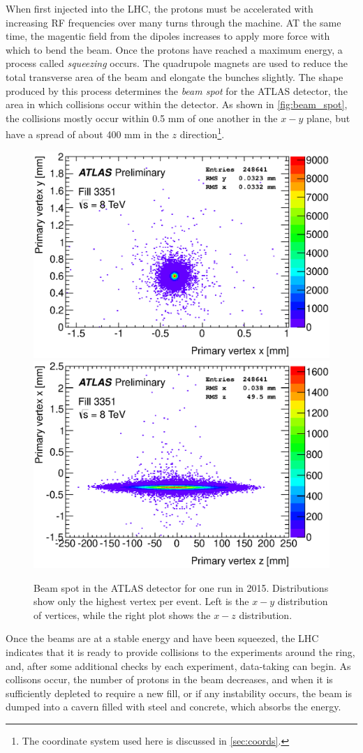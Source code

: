 When first injected into the \ac{LHC}, the protons must be accelerated with increasing \ac{RF} frequencies over many turns through the machine. AT the same time, the magentic field from the dipoles increases to apply more force with which to bend the beam. Once the protons have reached a maximum energy, a process called \textit{squeezing} occurs. The quadrupole magnets are used to reduce the total transverse area of the beam and elongate the bunches slightly. The shape produced by this process determines the \textit{beam spot} for the \ac{ATLAS} detector, the area in which collisions occur within the detector. As shown in \autoref{fig:beam_spot}, the collisions mostly occur within 0.5 mm of one another in the $x-y$ plane, but have a spread of about 400 mm in the $z$ direction\footnote{The coordinate system used here is discussed in \autoref{sec:coords}.}.

\begin{centering}
\begin{figure}[!hbt]
\myfloatalign
\includegraphics[width=.45\linewidth]{figures/lhc/beamspot-run215456-vtx-yx.eps}
\includegraphics[width=.45\linewidth]{figures/lhc/beamspot-run215456-vtx-xz.eps}
\caption{Beam spot in the \ac{ATLAS} detector for one run in 2015. Distributions show only the highest \pt vertex per event. Left is the $x-y$ distribution of vertices, while the right plot shows the $x-z$ distribution.}
\label{fig:beam_spot}
\end{figure}
\end{centering}

Once the beams are at a stable energy and have been squeezed, the \ac{LHC} indicates that it is ready to provide collisions to the experiments around the ring, and, after some additional checks by each experiment, data-taking can begin. As collisons occur, the number of protons in the beam decreases, and when it is sufficiently depleted to require a new fill, or if any instability occurs, the beam is dumped into a cavern filled with steel and concrete, which absorbs the energy. 

